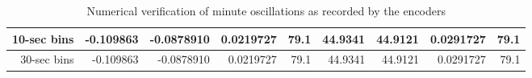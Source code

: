 \begin{table}[htbp]
\begin{tabular}{|r|r|r|r|r|r|r|r|r|}
10-sec bins            & -0.109863                      & -0.0878910                     & 0.0219727                        & 79.1                                & 44.9341                        & 44.9121                        & 0.0291727                        & 79.1                                \\ \hline
30-sec bins            & -0.109863                      & -0.0878910                     & 0.0219727                        & 79.1                                & 44.9341                        & 44.9121                        & 0.0291727                        & 79.1                                \\ \hline
\end{tabular}
\caption{Numerical verification of minute oscillations as recorded by the encoders}
\label{tab:encoders}
\end{table}

